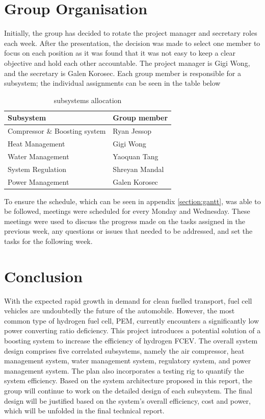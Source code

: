 \documentclass[a4paper,11pt]{article}
\begin{document}
\section{Group Organisation}
Initially, the group has decided to rotate the project manager and secretary roles each week. After the presentation, the decision was made to select one member to focus on each position as it was found that it was not easy to keep a clear objective and hold each other accountable. The project manager is Gigi Wong, and the secretary is Galen Korosec. Each group member is responsible for a subsystem; the individual assignments can be seen in the table below

\begin{table}[h!]
    \centering
    \begin{tabular}{|l|l|}%
    \hline
    \textbf{Subsystem} & \textbf{Group member} \\ [0.5ex] 
    \hline
    Compressor \& Boosting system & Ryan Jessop \\
    Heat Management & Gigi Wong \\
    Water Management & Yaoquan Tang \\
    System Regulation & Shreyan Mandal \\
    Power Management & Galen Korosec \\
    \hline
    \end{tabular}
    \caption{subsystems allocation}
    \label{tab:groupworkassignments}
\end{table}

To ensure the schedule, which can be seen in appendix \ref{section:gantt}, was able to be followed, meetings were scheduled for every Monday and Wednesday. These meetings were used to discuss the progress made on the tasks assigned in the previous week, any questions or issues that needed to be addressed, and set the tasks for the following week.

\section{Conclusion}
With the expected rapid growth in demand for clean fuelled transport, fuel cell vehicles are undoubtedly the future of the automobile. However, the most common type of hydrogen fuel cell, PEM, currently encounters a significantly low power converting ratio deficiency. This project introduces a potential solution of a boosting system to increase the efficiency of hydrogen FCEV. The overall system design comprises five correlated subsystems, namely the air compressor, heat management system, water management system, regulatory system, and power management system. The plan also incorporates a testing rig to quantify the system efficiency.
Based on the system architecture proposed in this report, the group will continue to work on the detailed design of each subsystem. The final design will be justified based on the system's overall efficiency, cost and power, which will be unfolded in the final technical report.\\
\end{document}
